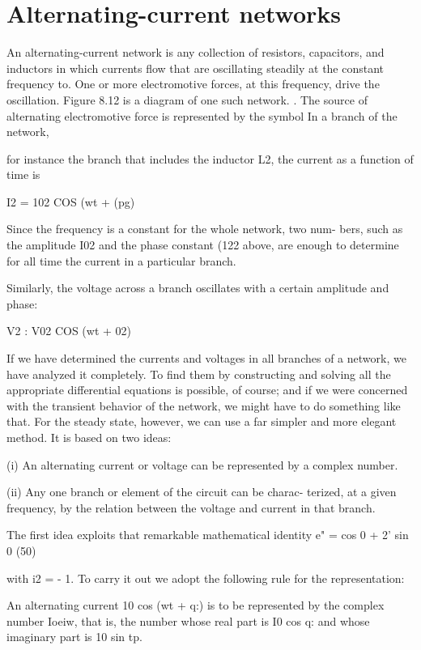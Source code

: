 \section{Alternating-current networks}

An alternating-current network is any collection of resistors,
capacitors, and inductors in which currents flow that are oscillating
steadily at the constant frequency to. One or more electromotive
forces, at this frequency, drive the oscillation. Figure 8.12 is a diagram
of one such network. . The source of alternating electromotive
force is represented by the symbol  In a branch of the network,

for instance the branch that includes the inductor L2, the current as
a function of time is

I2 = 102 COS (wt + (pg) 

Since the frequency is a constant for the whole network, two num-
bers, such as the amplitude I02 and the phase constant (122 above, are
enough to determine for all time the current in a particular branch.

 

Similarly, the voltage across a branch oscillates with a certain
amplitude and phase:

V2 : V02 COS (wt + 02) 

If we have determined the currents and voltages in all branches of
a network, we have analyzed it completely. To find them by constructing
and solving all the appropriate differential equations is
possible, of course; and if we were concerned with the transient behavior
of the network, we might have to do something like that. For
the steady state, however, we can use a far simpler and more elegant
method. It is based on two ideas:

(i) An alternating current or voltage can be represented by a
complex number.

(ii) Any one branch or element of the circuit can be charac-
terized, at a given frequency, by the relation between the
voltage and current in that branch.

The first idea exploits that remarkable mathematical identity
e" = cos 0 + 2' sin 0 (50)

with i2 = - 1. To carry it out we adopt the following rule for the
representation:

  

An alternating current 10 cos (wt + q:) is to be represented
by the complex number Ioeiw, that is, the number whose real
part is I0 cos q: and whose imaginary part is 10 sin tp.

